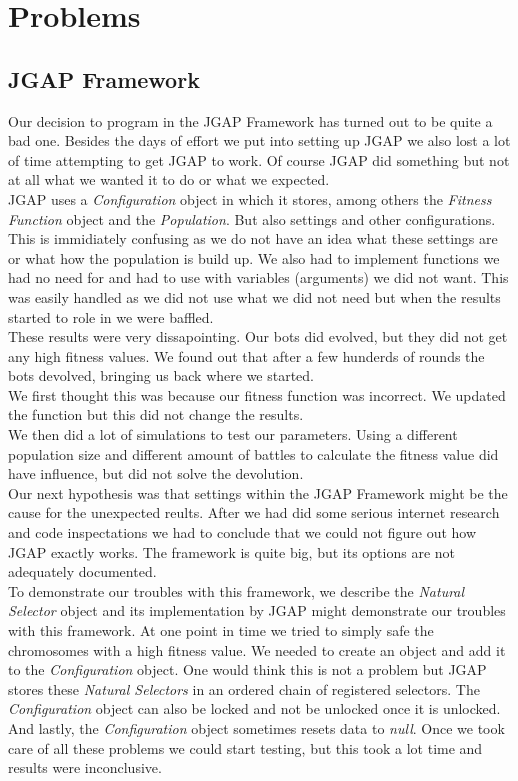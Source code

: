 \documentclass[a4paper,10pt]{article}
\begin{document}
\section{Problems}
\label{sec:problems}
\subsection{JGAP Framework}
Our decision to program in the JGAP Framework has turned out to be quite a bad one. Besides the days of effort we put into setting up JGAP we also lost a lot of time attempting to get JGAP to work. Of course JGAP did something but not at all what we wanted it to do or what we expected.\\

JGAP uses a \textit{Configuration} object in which it stores, among others the \textit{Fitness Function} object and the \textit{Population}. But also settings and other configurations. This is immidiately confusing as we do not have an idea what these settings are or what how the population is build up. We also had to implement functions we had no need for and had to use with variables (arguments) we did not want. This was easily handled as we did not use what we did not need but when the results started to role in we were baffled.\\

These results were very dissapointing. Our bots did evolved, but they did not get any high fitness values. We found out that after a few hunderds of rounds the bots devolved, bringing us back where we started.\\
We first thought this was because our fitness function was incorrect. We updated the function but this did not change the results.\\
We then did a lot of simulations to test our parameters. Using a different population size and different amount of battles to calculate the fitness value did have influence, but did not solve the devolution.\\

Our next hypothesis was that settings within the JGAP Framework might be the cause for the unexpected reults. After we had did some serious internet research and code inspectations we had to conclude that we could not figure out how JGAP exactly works. The framework is quite big, but its options are not adequately documented.\\

To demonstrate our troubles with this framework, we describe the \textit{Natural Selector} object and its implementation by JGAP might demonstrate our troubles with this framework. At one point in time we tried to simply safe the chromosomes with a high fitness value. We needed to create an object and add it to the \textit{Configuration} object. One would think this is not a problem but JGAP stores these \textit{Natural Selectors} in an ordered chain of registered selectors. The \textit{Configuration} object can also be locked and not be unlocked once it is unlocked. And lastly, the \textit{Configuration} object sometimes resets data to \textit{null}. Once we took care of all these problems we could start testing, but this took a lot time and results were inconclusive.\\
\end{document}
